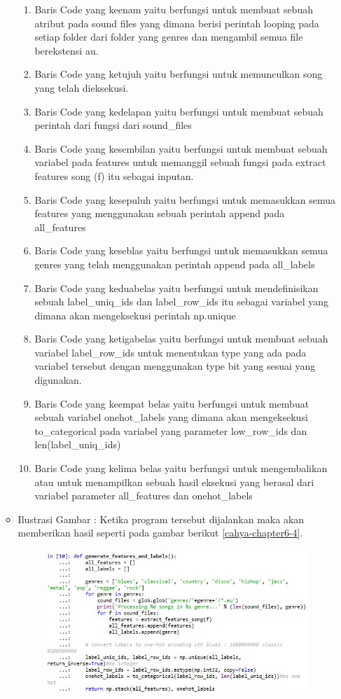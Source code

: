 \begin{enumerate}
\begin{itemize}
\begin{enumerate}
\item Baris Code yang keenam yaitu berfungsi untuk membuat sebuah atribut pada sound files yang dimana berisi perintah looping pada setiap folder dari folder yang genres dan mengambil semua file berekstensi au.
\item Baris Code yang ketujuh yaitu berfungsi untuk memunculkan song yang telah dieksekusi.
\item Baris Code yang kedelapan yaitu berfungsi untuk membuat sebuah perintah dari fungsi dari sound\_files
\item Baris Code yang kesembilan yaitu berfungsi untuk membuat sebuah variabel pada features untuk memanggil sebuah fungsi pada extract features song (f) itu sebagai inputan.
\item Baris Code yang kesepuluh yaitu berfungsi untuk memasukkan semua features yang menggunakan sebuah perintah append pada all\_features
\item Baris Code yang keseblas yaitu berfungsi untuk memasukkan semua genres yang telah menggunakan perintah append pada all\_labels
\item Baris Code yang keduabelas yaitu berfungsi untuk mendefinisikan sebuah label\_uniq\_ids dan label\_row\_ids itu sebagai variabel yang dimana akan mengeksekusi perintah np.unique
\item Baris Code yang ketigabelas yaitu berfungsi untuk membuat sebuah variabel label\_row\_ids untuk menentukan type yang ada pada variabel tersebut dengan menggunakan type bit yang sesuai yang digunakan.
\item Baris Code yang keempat belas yaitu berfungsi untuk membuat sebuah variabel onehot\_labels yang dimana akan mengeksekusi to\_categorical pada variabel yang parameter low\_row\_ids dan len(label\_uniq\_ids)
\item Baris Code yang kelima belas yaitu berfungsi untuk mengembalikan atau untuk menampilkan sebuah hasil eksekusi yang berasal dari variabel parameter all\_features dan onehot\_labels
\end{enumerate}
\par
\item Ilustrasi Gambar : Ketika program tersebut dijalankan maka akan memberikan hasil seperti pada gambar berikut \ref{cahya-chapter6-4}.
\par
\begin{figure}[!hbtp]
\centering
\includegraphics[scale=0.2]{figures/cahya-chapter6-4.jpg}

\end{figure}
\end{itemize}
\end{enumerate}
